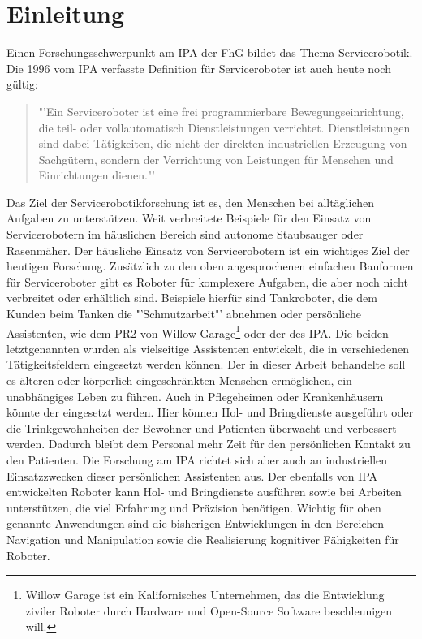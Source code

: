 
\chapter{Einleitung}
Einen Forschungsschwerpunkt am \ac{IPA} der \ac{FhG} bildet das Thema 
Servicerobotik. Die 1996 vom \ac{IPA} verfasste Definition für Serviceroboter 
ist auch heute noch gültig:

\begin{quote}"'Ein Serviceroboter ist 
eine frei programmierbare Bewegungseinrichtung, die teil- oder vollautomatisch 
Dienstleistungen verrichtet. Dienstleistungen sind dabei Tätigkeiten, die nicht 
der direkten industriellen Erzeugung von Sachgütern, sondern der Verrichtung von 
Leistungen für Menschen und Einrichtungen dienen."'\cite{Schraft1996}\end{quote} 

Das Ziel der Servicerobotikforschung ist es, den Menschen bei alltäglichen Aufgaben zu 
unterstützen. Weit verbreitete Beispiele für den Einsatz von Servicerobotern im 
häuslichen Bereich sind autonome Staubsauger oder Rasenmäher. Der häusliche 
Einsatz von Servicerobotern ist ein wichtiges Ziel der heutigen Forschung. 
Zusätzlich zu den oben angesprochenen einfachen Bauformen für Serviceroboter 
gibt es Roboter für komplexere Aufgaben, die aber noch nicht verbreitet oder 
erhältlich sind. Beispiele hierfür sind Tankroboter, die dem Kunden beim Tanken 
die "'Schmutzarbeit"'\nocite{tankpitstop} abnehmen oder persönliche Assistenten, 
wie dem PR2 von Willow Garage\footnote{Willow Garage ist ein Kalifornisches 
Unternehmen, das die Entwicklung ziviler Roboter durch Hardware und Open-Source
Software beschleunigen will.} oder der \cob des \ac{IPA}. Die beiden letztgenannten 
wurden als vielseitige Assistenten entwickelt, die in verschiedenen 
Tätigkeitsfeldern eingesetzt werden können. Der in dieser Arbeit behandelte \cob 
soll es älteren oder körperlich eingeschränkten Menschen ermöglichen, ein 
unabhängiges Leben zu führen. Auch in Pflegeheimen oder 
Krankenhäusern könnte der \cob eingesetzt werden. Hier können Hol- und Bringdienste ausgeführt oder die 
Trinkgewohnheiten der Bewohner und Patienten überwacht und verbessert werden. Dadurch 
bleibt dem Personal mehr Zeit für den persönlichen Kontakt zu den Patienten. Die 
Forschung am \ac{IPA} richtet sich aber auch an industriellen Einsatzzwecken 
dieser persönlichen Assistenten aus. Der ebenfalls von \ac{IPA} entwickelten 
Roboter \raw kann Hol- und Bringdienste ausführen sowie bei Arbeiten unterstützen, 
die viel Erfahrung und Präzision benötigen. Wichtig für oben genannte Anwendungen 
sind die bisherigen Entwicklungen in den Bereichen Navigation und Manipulation 
sowie die Realisierung kognitiver Fähigkeiten für Roboter.

